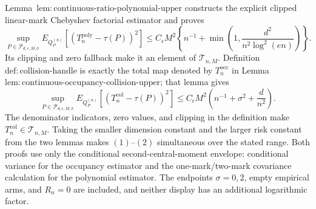 Lemma~\(\mathrm{lem:continuous\text{-}ratio\text{-}polynomial\text{-}upper}\) constructs the explicit clipped linear-mark Chebyshev factorial estimator and proves
\[
 \sup_{P\in\mathcal P_{d,\epsilon,M,\sigma}}
 E_{Q_P^{(n)}}[(T_n^{\mathrm{poly}}-\tau(P))^2]
 \le C_{\epsilon}M^2\left\{n^{-1}+\min\left(1,\frac{d^2}{n^2\log^2(en)}\right)\right\}.
\tag{1}
\]
Its clipping and zero fallback make it an element of \(\mathcal T_{n,M}\).  Definition~\(\mathrm{def:collision\text{-}handle}\) is exactly the total map denoted by \(T_n^{\mathrm{occ}}\) in Lemma~\(\mathrm{lem:continuous\text{-}occupancy\text{-}collision\text{-}upper}\); that lemma gives
\[
 \sup_{P\in\mathcal P_{d,\epsilon,M,\sigma}}
 E_{Q_P^{(n)}}[(T_n^{\mathrm{col}}-\tau(P))^2]
 \le C_{\epsilon}M^2\left(n^{-1}+\sigma^2+\frac d{n^2}\right).
\tag{2}
\]
The denominator indicators, zero values, and clipping in the definition make \(T_n^{\mathrm{col}}\in\mathcal T_{n,M}\).  Taking the smaller dimension constant and the larger risk constant from the two lemmas makes \((1)\)--\((2)\) simultaneous over the stated range.  Both proofs use only the conditional second-central-moment envelope: conditional variance for the occupancy estimator and the one-mark/two-mark covariance calculation for the polynomial estimator.  The endpoints \(\sigma=0,2\), empty empirical arms, and \(R_n=0\) are included, and neither display has an additional logarithmic factor.
